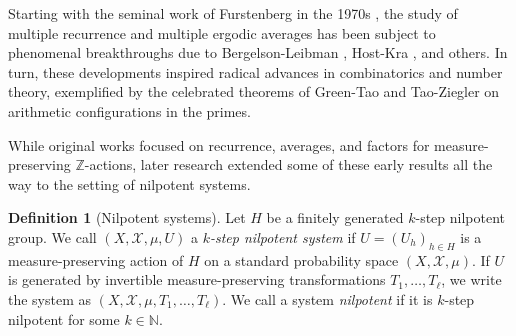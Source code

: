 \documentclass[11pt]{amsart}
\theoremstyle{definition}
\newtheorem{definition}[lemma]{Definition}
\newcommand{\N}{{\mathbb N}}
\newcommand{\Z}{{\mathbb Z}}
\newcommand{\CX}{{\mathcal X}}
\newcommand{\1}{{\mathbf{1}}}
\begin{document}
Starting with the seminal work of Furstenberg in the 1970s \cite{Fu77}, the study of multiple recurrence and multiple ergodic averages has been subject to phenomenal breakthroughs due to Bergelson-Leibman \cite{BL96}, Host-Kra \cite{HK05a}, and others. In turn, these developments inspired radical advances in combinatorics and number theory, exemplified by the celebrated theorems of Green-Tao \cite{GT08b} and Tao-Ziegler \cite{TZ08} on arithmetic configurations in the primes.

While original works focused on recurrence, averages, and factors for measure-preserving $\Z$-actions, later research extended some of these early results all the way to the setting of nilpotent systems. %
\begin{definition}[Nilpotent systems]\label{D: nilpotent systems}
    Let $H$ be a finitely generated $k$-step nilpotent group. We call $(X, \CX, \mu, U)$ a \emph{$k$-step nilpotent system} if $U = (U_h)_{h\in H}$ is a measure-preserving action of $H$ on a standard probability space $(X, \CX, \mu)$. If $U$ is generated by invertible measure-preserving transformations $T_1, \ldots, T_\ell$, we write the system as $(X, \CX, \mu, T_1, \ldots, T_\ell)$. We call a system \emph{nilpotent} if it is $k$-step nilpotent for some $k\in\N$.
\end{definition}
\end{document}
